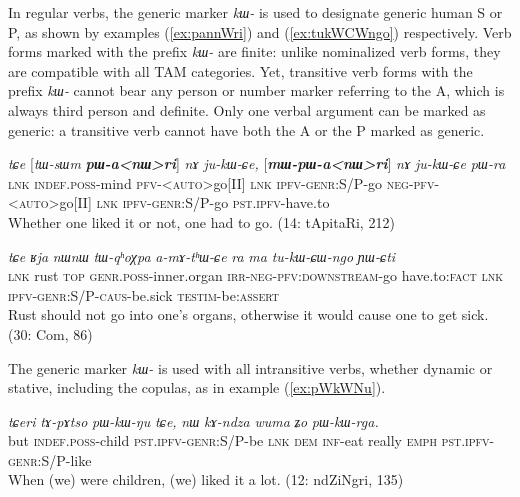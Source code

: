 \documentclass[oneside,a4paper,11pt]{article}
\newcommand{\ipa}[1]{\textit{\phon\mbox{#1}}} %
\newcommand{\refb}[1]{(\ref{#1})}
\begin{document}
In regular verbs, the generic marker \ipa{kɯ-} is used to designate generic human S or P, as shown by examples \refb{ex:pannWri} and \refb{ex:tukWCWngo} respectively. Verb forms marked with the prefix \ipa{kɯ-} are  finite: unlike nominalized verb forms, they are compatible with all TAM categories. Yet, transitive verb forms with the prefix \ipa{kɯ-} cannot bear any person or number marker referring to the A, which is always third person and definite. Only one verbal argument can be marked as generic: a transitive verb cannot have both the A or the P marked as generic.


\begin{exe}
\ex  \label{ex:pannWri}
\gll
\ipa{tɕe}  	[\ipa{tɯ-sɯm}  	\textbf{\ipa{pɯ-a<nɯ>ri}}]  	\ipa{nɤ}  	\ipa{ju-kɯ-ɕe,}  	[\textbf{\ipa{mɯ-pɯ-a<nɯ>ri}}]  	\ipa{nɤ}  	\ipa{ju-kɯ-ɕe}  	\ipa{pɯ-ra}  \\
\textsc{lnk} \textsc{indef.poss}-mind  \textsc{pfv-<auto>}go[II] \textsc{lnk} \textsc{ipfv-genr}:S/P-go \textsc{neg-pfv-<auto>}go[II] \textsc{lnk} \textsc{ipfv-genr}:S/P-go \textsc{pst.ipfv}-have.to \\
\glt Whether one liked it or not, one had to go. (14: tApitaRi, 212)
\end{exe}


\begin{exe}
\ex \label{ex:tukWCWngo}
\gll  \ipa{tɕe} 	\ipa{ʁja} 	\ipa{nɯnɯ} 	\ipa{tɯ-qʰoχpa} 	\ipa{a-mɤ-tʰɯ-ɕe} 	\ipa{ra} 	\ipa{ma} 	\ipa{tu-kɯ-ɕɯ-ngo} 	\ipa{ɲɯ-ɕti} \\
\textsc{lnk} rust \textsc{top} \textsc{genr.poss}-inner.organ \textsc{irr-neg-pfv:downstream}-go have.to:\textsc{fact} \textsc{lnk} \textsc{ipfv-genr:S/P-caus}-be.sick  \textsc{testim}-be:\textsc{assert} \\
\glt Rust should not go into one's organs, otherwise it would cause one to get sick. (30: Com, 86)
\end{exe}

The generic marker \ipa{kɯ-} is used with all intransitive verbs, whether dynamic or stative, including the copulas, as in example \refb{ex:pWkWNu}. 

\begin{exe}
\ex \label{ex:pWkWNu}
\gll
\ipa{tɕeri} 	\ipa{tɤ-pɤtso} 	\ipa{pɯ-kɯ-ŋu} 	\ipa{tɕe,} 	\ipa{nɯ} 	\ipa{kɤ-ndza} 	\ipa{wuma} 	\ipa{ʑo} 	\ipa{pɯ-kɯ-rga.} \\
but \textsc{indef.poss}-child \textsc{pst.ipfv-genr}:S/P-be \textsc{lnk} \textsc{dem} \textsc{inf}-eat really \textsc{emph} \textsc{pst.ipfv-genr}:S/P-like \\
\glt When (we) were children, (we) liked it a lot. (12: ndZiNgri, 135)
\end{exe}
\end{document}
